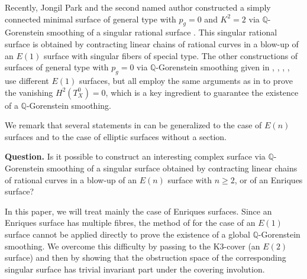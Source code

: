 \documentclass[twoside,11pt]{amsart}
\begin{document}
Recently, Jongil Park and the second named author constructed a
simply connected minimal surface of general type with $p_g=0$ and
$K^2=2$ via ${{\mathbb Q}}$-Gorenstein smoothing of a singular rational
surface \cite{LP1}. This singular rational surface is obtained by
contracting linear chains of rational curves in a blow-up of an
$E(1)$ surface with singular fibers of special type. The other
constructions of surfaces of general type with $p_g=0$ via
${{\mathbb Q}}$-Gorenstein smoothing given in \cite{LP2}, \cite{PPS1},
\cite{PPS2}, \cite{PPS3}, use different $E(1)$ surfaces, but all
employ the same arguments as in \cite{LP1} to prove the vanishing
$H^2(T^0_X)=0$, which is a key ingredient to guarantee the
existence of a ${{\mathbb Q}}$-Gorenstein smoothing.

We remark that several statements in \cite{LP1} can be generalized
to the case of $E(n)$ surfaces and to the case of elliptic
surfaces without a section.

{\medskip}

{\noindent}{\bf Question.}  Is it possible to construct an interesting
complex surface via ${{\mathbb Q}}$-Gorenstein smoothing of a singular
surface obtained by contracting linear chains of rational curves
in a blow-up of an $E(n)$ surface with $n\ge 2$, or of an
 Enriques surface?

{\medskip} In this paper, we will treat mainly the case of Enriques
surfaces. Since an Enriques surface has multiple fibres, the
method of \cite{LP1} for the case of an $E(1)$ surface cannot be
applied directly to prove the existence of a global
${{\mathbb Q}}$-Gorenstein smoothing. We overcome this difficulty by passing
to the K3-cover (an $E(2)$ surface) and then by showing that the
obstruction space of the corresponding singular surface has
trivial invariant part under the covering involution.
\end{document}

